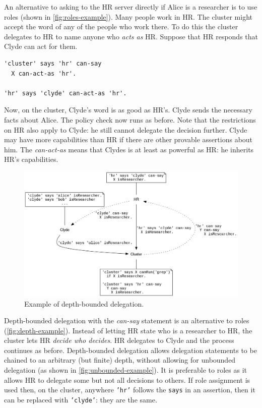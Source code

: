 \documentclass[thesis.tex]{subfiles}
\begin{document}
An alternative to asking to the HR server directly if Alice is a
researcher is to use roles (shown in
\autoref{fig:roles-example}). Many people work in HR. The cluster
might accept the word of any of the people who work there. To do this
the cluster delegates to HR to name anyone who \emph{acts as}
HR. Suppose that HR responds that Clyde can act for them.
\begin{lstlisting}
'cluster' says 'hr' can-say
  X can-act-as 'hr'.

'hr' says 'clyde' can-act-as 'hr'.
\end{lstlisting} Now, on the cluster, Clyde's word is as good as HR's. Clyde
sends the necessary facts about Alice. The policy check now runs as before. Note
that the restrictions on HR also apply to Clyde: he still cannot delegate the
decision further. Clyde may have more capabilities than HR if there are other
provable assertions about him. The \emph{can-act-as} means that Clydes is at
least as powerful as HR: he inherits HR's capabilities.

\begin{figure}
  \centering
  \includegraphics[width=\textwidth]{figures/secpal-example-delegation2.png}
  \caption{Example of depth-bounded delegation.}
  \label{fig:depth-example}
\end{figure}

Depth-bounded delegation with the \emph{can-say} statement is an alternative to
roles (\autoref{fig:depth-example}). Instead of letting HR state who is a
researcher to HR, the cluster lets HR \emph{decide who decides}. HR delegates to
Clyde and the process continues as before. Depth-bounded delegation allows
delegation statements to be chained to an arbitrary (but finite) depth, without
allowing for unbounded delegation (as shown in \autoref{fig:unbounded-example}). It is preferable to roles as it allows HR to
delegate some but not all decisions to others. If role assignment is used then,
on the cluster, anywhere \texttt{'hr'} follows the \texttt{says} in an
assertion, then it can be replaced with \texttt{'clyde'}: they are the same.
\end{document}
